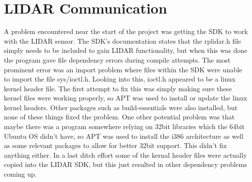 		\section{LIDAR Communication}
		A problem encountered near the start of the project was getting the SDK to work with the LIDAR sensor. The SDK's documentation states that the rplidar.h file simply needs to be included to gain LIDAR functionality, but when this was done the program gave file dependency errors during compile attempts. The most prominent error was an import problem where files within the SDK were unable to import the file sys/ioctl.h. Looking into this, ioctl.h appeared to be a linux kernel header file. The first attempt to fix this was simply making sure these kernel files were working properly, so APT was used to install or update the linux kernel headers. Other packages such as build-essentials were also installed, but none of these things fixed the problem. One other potential problem was that maybe there was a program somewhere relying on 32bit libraries which the 64bit Ubuntu OS didn't have, so APT was used to install the i386 architecture as well as some relevant packages to allow for better 32bit support. This didn't fix anything either. In a last ditch effort some of the kernal header files were actually copied into the LIDAR SDK, but this just resulted in other dependency problems coming up.
		
